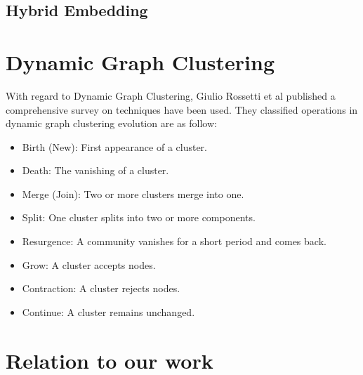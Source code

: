 

\newpage
\subsection{Hybrid Embedding}



\newpage
\section{Dynamic Graph Clustering}

With regard to Dynamic Graph Clustering, Giulio Rossetti et al \cite{rossetti2018community} published a comprehensive survey on techniques have been used. They classified operations in dynamic graph clustering evolution are as follow:

\begin{itemize}
    \item Birth (New): First appearance of a cluster.
    \item Death: The vanishing of a cluster.
    \item Merge (Join): Two or more clusters merge into one.
    \item Split: One cluster splits into two or more components.
    \item Resurgence: A community vanishes for a short period and comes back.
    \item Grow: A cluster accepts nodes.
    \item Contraction: A cluster rejects nodes.
    \item Continue: A cluster remains unchanged.
\end{itemize}

\newpage
\section{Relation to our work}



